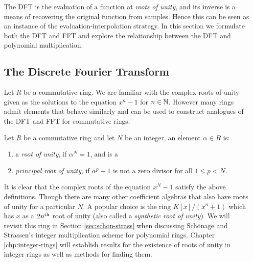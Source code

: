 The DFT is the evaluation of a function at \textit{roots of unity}, and its inverse is a means of recovering the original function from samples. Hence this can be seen as an instance of the evaluation-interpolation strategy. 
In this section we formulate both the DFT and FFT and explore the relationship between the DFT and polynomial multiplication.

\subsection{The Discrete Fourier Transform}

Let $R$ be a commutative ring. We are familiar with the complex roots of unity given as the solutions to the equation $x^n - 1$ for $n \in {\mathbb N}$. However many rings admit elements that behave similarly and can be used to construct analogues of the DFT and FFT for commutative rings.

\begin{definition}
  Let $R$ be a commutative ring and let $N$ be an integer, an element $\alpha \in R$ is: 
  \begin{enumerate}
      \item a \textit{root of unity}, if $\alpha^N = 1$, and is a 
      \item \textit{principal root of unity}, if $\alpha^p - 1$ is not a zero divisor for all $1 \leq p < N$.
  \end{enumerate}
\end{definition}

It is clear that the complex roots of the equation $x^N - 1$ satisfy the above definitions. Though there are many other coefficient algebras that also have roots of unity for a particular $N$. A popular choice is the ring $K[x]/(x^n + 1)$ which has $x$ as a $2n^{\textrm{th}}$ root of unity (also called a \textit{synthetic root of unity}). We will revisit this ring in Section \ref{sec:schon-strass} when discussing Sch\"{o}nage and Strassen's integer multiplication scheme for polynomial rings. Chapter \ref{chp:integer-rings} will establish results for the existence of roots of unity in integer rings as well as methods for finding them. 

